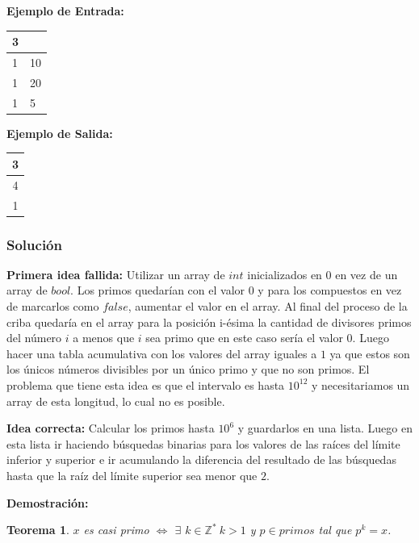 \documentclass[12pt]{article}
\newcommand{\nl}{\vspace{0.3cm}}
\newtheorem{theorem}{Teorema}
\begin{document}
\nl

\textbf{Ejemplo de Entrada:}

\nl

\begin{tabular}{|l|l|}
	\hline 3 &  \\ 
	\hline 1 & 10 \\ 
	\hline 1 & 20 \\ 
	\hline 1 & 5 \\ 
	\hline 
\end{tabular} 

\nl

\textbf{Ejemplo de Salida:}

\nl

\begin{tabular}{|c|}
	\hline 3 \\ 
	\hline 4 \\ 
	\hline 1 \\ 
	\hline 
\end{tabular} 

\nl

\subsubsection{Solución}

\textbf{Primera idea fallida:} Utilizar un array de $int$ inicializados en $0$ en vez de un array de $bool$. Los primos quedarían con el valor $0$ y para los compuestos en vez de marcarlos como $false$, aumentar el valor en el array. Al final del proceso de la criba quedaría en el array para la posición i-ésima la cantidad de divisores primos del número $i$ a menos que $i$ sea primo que en este caso sería el valor $0$. Luego hacer una tabla acumulativa con los valores del array iguales a $1$ ya que estos son los únicos números divisibles por un único primo y que no son primos. El problema que tiene esta idea es que el intervalo es hasta $10^{12}$ y necesitariamos un array de esta longitud, lo cual no es posible.

\nl

\textbf{Idea correcta:} Calcular los primos hasta $10^6$ y guardarlos en una lista. Luego en esta lista ir haciendo búsquedas binarias para los valores de las raíces del límite inferior y superior e ir acumulando la diferencia del resultado de las búsquedas hasta que la raíz del límite superior sea menor que $2$.

\nl

\textbf{Demostración:}

\begin{theorem}
	$x$ es casi primo $\iff$ $\exists$ $k \in \mathbb{Z^*}\ k > 1$ y $p \in primos$ tal que $p^k = x$.
\end{theorem}
\end{document}
